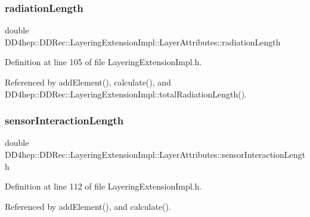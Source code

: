 \subsubsection{\texorpdfstring{radiation\+Length}{radiationLength}}
{\footnotesize\ttfamily double D\+D4hep\+::\+D\+D\+Rec\+::\+Layering\+Extension\+Impl\+::\+Layer\+Attributes\+::radiation\+Length}



Definition at line 105 of file Layering\+Extension\+Impl.\+h.



Referenced by add\+Element(), calculate(), and D\+D4hep\+::\+D\+D\+Rec\+::\+Layering\+Extension\+Impl\+::total\+Radiation\+Length().

\hypertarget{struct_d_d4hep_1_1_d_d_rec_1_1_layering_extension_impl_1_1_layer_attributes_a3fab0dd2b11df5f60de6355c0b83ca44}{}\label{struct_d_d4hep_1_1_d_d_rec_1_1_layering_extension_impl_1_1_layer_attributes_a3fab0dd2b11df5f60de6355c0b83ca44} 
\subsubsection{\texorpdfstring{sensor\+Interaction\+Length}{sensorInteractionLength}}
{\footnotesize\ttfamily double D\+D4hep\+::\+D\+D\+Rec\+::\+Layering\+Extension\+Impl\+::\+Layer\+Attributes\+::sensor\+Interaction\+Length}



Definition at line 112 of file Layering\+Extension\+Impl.\+h.



Referenced by add\+Element(), and calculate().

\hypertarget{struct_d_d4hep_1_1_d_d_rec_1_1_layering_extension_impl_1_1_layer_attributes_addc3c7d619e7a52a23222ec6ffed2833}{}\label{struct_d_d4hep_1_1_d_d_rec_1_1_layering_extension_impl_1_1_layer_attributes_addc3c7d619e7a52a23222ec6ffed2833} 
